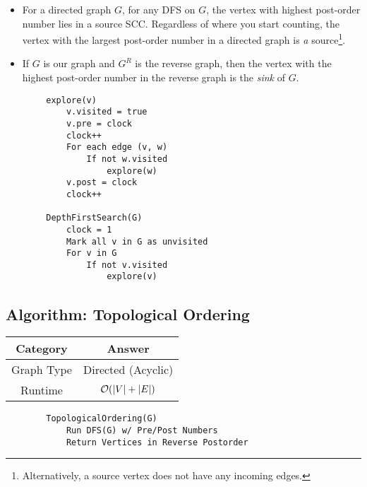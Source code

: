 \documentclass[letterpaper]{article}
\begin{document}
\begin{itemize}
    \item For a directed graph $G$, for any DFS on $G$, the vertex with highest post-order number lies in a source SCC. Regardless of where you start counting, the vertex with the largest post-order number in a directed graph is \emph{a} source\footnote{Alternatively, a source vertex does not have any incoming edges.}.
    \item If $G$ is our graph and $G^R$ is the reverse graph, then the vertex with the highest post-order number in the reverse graph is the \emph{sink} of $G$. 
\end{itemize}

\begin{mdframed}[]
    \begin{verbatim}
        explore(v)
            v.visited = true 
            v.pre = clock 
            clock++
            For each edge (v, w)
                If not w.visited
                    explore(w)
            v.post = clock 
            clock++
    
        DepthFirstSearch(G)
            clock = 1
            Mark all v in G as unvisited
            For v in G
                If not v.visited
                    explore(v)\end{verbatim}
\end{mdframed}


\subsection{Algorithm: Topological Ordering}
\begin{center}
    \begin{tabular}{|c|c|}
        \hline 
        \textbf{Category} & \textbf{Answer} \\ 
        \hline 
        Graph Type & Directed (Acyclic) \\ 
        Runtime & $\mathcal{O}(|V| + |E|)$ \\ 
        \hline 
    \end{tabular}
\end{center}

\begin{mdframed}[]
    \begin{verbatim}
        TopologicalOrdering(G)
            Run DFS(G) w/ Pre/Post Numbers 
            Return Vertices in Reverse Postorder\end{verbatim}
\end{mdframed}
\end{document}
